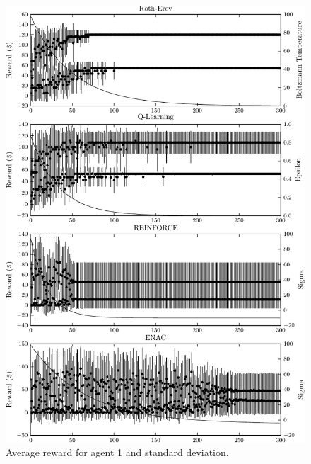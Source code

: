 {\begin{figure}
	  \includegraphics{figures/fig5_2_reward_a1}
	  \caption{Average reward for agent 1 and standard deviation.}
	  \label{fig:5_2_reward_a1}
	\end{figure}
	\begin{figure}
	  \centering

\end{figure}}
